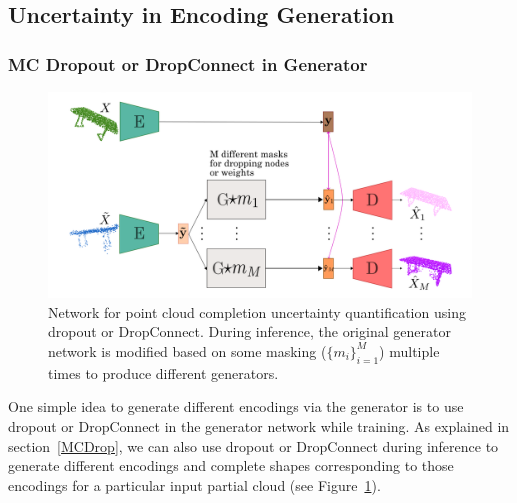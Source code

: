     
    \subsection{Uncertainty in Encoding Generation}
        \subsubsection{MC Dropout or DropConnect in Generator}
        \begin{figure}[htb]
          \begin{center}
          \includegraphics[width=\linewidth]{figures/drop_network.png}
          \end{center}
      \caption{Network for point cloud completion uncertainty quantification using dropout or DropConnect. During inference, the original generator network is modified based on some masking ($\{m_i\}_{i=1}^M$) multiple times to produce different generators.}\label{fig:drop_net}
        \end{figure}
        One simple idea to generate different encodings via the generator is to use dropout or DropConnect in the generator network while training. As explained in section~\ref{MCDrop}, we can also use dropout or DropConnect during inference to generate different encodings and complete shapes corresponding to those encodings for a particular input partial cloud (see Figure~\ref{fig:drop_net}). 
        
